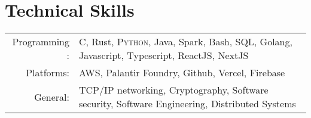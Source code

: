 \documentclass[a4paper,10pt]{article} %
\begin{document}

\section{Technical Skills}

\begin{tabular}{rl}
Programming : & \textsc{C}, Rust, \textsc{Python},
    Java, Spark, Bash, SQL, Golang, Javascript, Typescript, ReactJS, NextJS \\
Platforms: & AWS, Palantir Foundry, Github, Vercel, Firebase\\
General: & TCP/IP networking, Cryptography, Software security, Software Engineering, Distributed Systems \\
\end{tabular}
\end{document}
